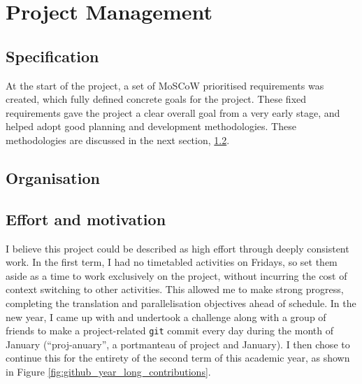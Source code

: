 \chapter{Project Management}
\label{ch:project-management}

\section{Specification}
\label{sec:specification}

At the start of the project, a set of MoSCoW prioritised \cite{CaseMethodFastTrack} requirements was created, which fully defined concrete goals for the project. %
These fixed requirements gave the project a clear overall goal from a very early stage, and helped adopt good planning and development methodologies. These methodologies are discussed in the next section, \ref{sec:organisation}.

\section{Organisation}
\label{sec:organisation}




\section{Effort and motivation}
\label{sec:effort-and-motivation}

I believe this project could be described as high effort through deeply consistent work. In the first term, I had no timetabled activities on Fridays, so set them aside as a time to work exclusively on the project, without incurring the cost of context switching to other activities. This allowed me to make strong progress, completing the translation and parallelisation objectives ahead of schedule. In the new year, I came up with and undertook a challenge along with a group of friends to make a project-related \texttt{git} commit every day during the month of January (``proj-anuary'', a portmanteau of project and January). I then chose to continue this for the entirety of the second term of this academic year, as shown in Figure \ref{fig:github_year_long_contributions}.

